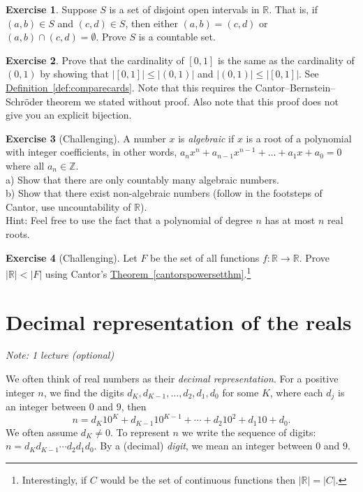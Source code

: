 \documentclass[12pt]{book}
\newcommand{\abs}[1]{\left\lvert {#1} \right\rvert}
\newcommand{\R}{{\mathbb{R}}}
\newcommand{\Z}{{\mathbb{Z}}}
\newcommand{\myindex}[1]{#1\index{#1}}
\newcommand{\sectionnotes}[1]{\noindent \emph{Note: #1} \medskip \par}
\newcommand{\sectionnewpage}{\clearpage}
\theoremstyle{plain}
\theoremstyle{remark}
\theoremstyle{definition}
\theoremstyle{exercise}
\newtheorem{exercise}{Exercise}[section]
\theoremstyle{example}
\newcommand{\thmref}[1]{\hyperref[#1]{Theorem~\ref*{#1}}}
\newcommand{\defnref}[1]{\hyperref[#1]{Definition~\ref*{#1}}}
\begin{document}
\begin{exercise}
Suppose $S$ is a set of disjoint open intervals in $\R$.  That is, 
if $(a,b) \in S$ and $(c,d) \in S$, then either $(a,b) = (c,d)$
or $(a,b) \cap (c,d) = \emptyset$.  Prove $S$ is a countable set.
\end{exercise}

\begin{exercise}
Prove that the cardinality of $[0,1]$ is the same as the cardinality of
$(0,1)$ by showing that
$\abs{[0,1]} \leq \abs{(0,1)}$ and
$\abs{(0,1)} \leq \abs{[0,1]}$.  See 
\defnref{def:comparecards}.
Note that this requires the Cantor--Bernstein--Schr\"oder theorem we
stated without proof.  Also note that this proof does not give you an
explicit bijection.
\end{exercise}

\begin{exercise}[Challenging]
A number $x$ is \emph{algebraic} if $x$ is a root of a polynomial with
integer coefficients, in other words, $a_n x^n + a_{n-1} x^{n-1}  + \ldots
+ a_1 x + a_0 = 0$ where all $a_n \in \Z$.\\
a) Show that there are only
countably many algebraic numbers.\\
b) Show that there exist non-algebraic
numbers (follow in the footsteps of Cantor, use uncountability of $\R$).\\
Hint: Feel free to use the fact that a polynomial of degree $n$ has at most $n$ real
roots.
\end{exercise}

\begin{exercise}[Challenging]
Let $F$ be the set of all functions $f \colon \R \to \R$.
Prove $\abs{\R} < \abs{F}$
using Cantor's \thmref{cantorspowersetthm}.\footnote{Interestingly,
if $C$ would be the set of continuous functions then $\abs{\R} = \abs{C}$.}
\end{exercise}


\sectionnewpage
\section{Decimal representation of the reals}
\label{sec:decimals}

\sectionnotes{1 lecture (optional)}

We often think of real numbers as their
\emph{\myindex{decimal representation}}.  For
a positive integer $n$, we find the digits $d_K,d_{K-1},\ldots,d_2,d_1,d_0$ for some
$K$,
where each $d_j$ is an integer between $0$ and $9$, then
\begin{equation*}
n = d_K {10}^K + d_{K-1} {10}^{K-1} + \cdots + d_2 {10}^2 + d_1 10 + d_0 .
\end{equation*}
We often assume $d_K \not= 0$.  To represent $n$ we write the sequence of
digits: $n = d_K d_{K-1} \cdots d_2 d_1 d_0$.
By a (decimal)
\emph{\myindex{digit}}, we mean an integer
between $0$ and $9$.
\end{document}
